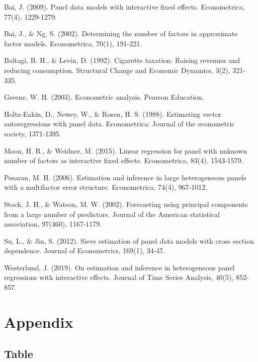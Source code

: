 \documentclass[a4paper]{article}
\begin{document}
\begin{description}
\item Bai, J. (2009). Panel data models with interactive fixed effects. Econometrica, 77(4), 1229-1279.
\item Bai, J., \& Ng, S. (2002). Determining the number of factors in approximate factor models. Econometrica, 70(1), 191-221.
\item Baltagi, B. H., \& Levin, D. (1992). Cigarette taxation: Raising revenues and reducing consumption. Structural Change and Economic Dynamics, 3(2), 321-335.
\item Greene, W. H. (2003). Econometric analysis. Pearson Education.
\item Holtz-Eakin, D., Newey, W., \& Rosen, H. S. (1988). Estimating vector autoregressions with panel data. Econometrica: Journal of the econometric society, 1371-1395.
\item Moon, H. R., \& Weidner, M. (2015). Linear regression for panel with unknown number of factors as interactive fixed effects. Econometrica, 83(4), 1543-1579.
\item Pesaran, M. H. (2006). Estimation and inference in large heterogeneous panels with a multifactor error structure. Econometrica, 74(4), 967-1012.
\item Stock, J. H., \& Watson, M. W. (2002). Forecasting using principal components from a large number of predictors. Journal of the American statistical association, 97(460), 1167-1179.
\item Su, L., \& Jin, S. (2012). Sieve estimation of panel data models with cross section dependence. Journal of Econometrics, 169(1), 34-47.
\item Westerlund, J. (2019). On estimation and inference in heterogeneous panel regressions with interactive effects. Journal of Time Series Analysis, 40(5), 852-857.
\end{description}







\newpage

\section*{Appendix}

\subsection*{Table}
\end{document}
